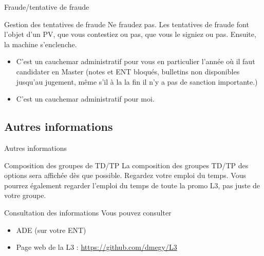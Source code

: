 \documentclass{beamer}
\begin{document}
 
  \begin{frame}{Fraude/tentative de fraude}
 \begin{alertblock}{Gestion des tentatives de fraude}
Ne fraudez pas. Les tentatives de fraude font l'objet d'un PV, que vous contestiez ou pas, que vous le signiez ou pas. Ensuite, la machine s'enclenche.
\begin{itemize}
\item C'est un cauchemar administratif pour vous en particulier l'année où il faut candidater en Master (notes et ENT bloqués, bulletins non disponibles jusqu'au \og jugement\fg, même s'il à la la fin il n'y a pas de sanction importante.)
\item C'est un cauchemar administratif pour moi.
\end{itemize}
 \end{alertblock}
 
 \end{frame}


\subsection{Autres informations}
\begin{frame}{Autres informations}

\begin{block}{Composition des groupes de TD/TP}
La composition des groupes TD/TP  des options sera affichée dès que possible. Regardez votre emploi du temps. Vous pourrez également regarder l'emploi du temps de toute la promo L3, pas juste de votre groupe.
\end{block}

\begin{block}{Consultation des informations}
Vous pouvez consulter 
\begin{itemize}
\item ADE (sur votre ENT)
\item Page web de la L3 : \url{https://github.com/dmegy/L3}
\end{itemize}
\end{block}
\end{frame}
\end{document}
